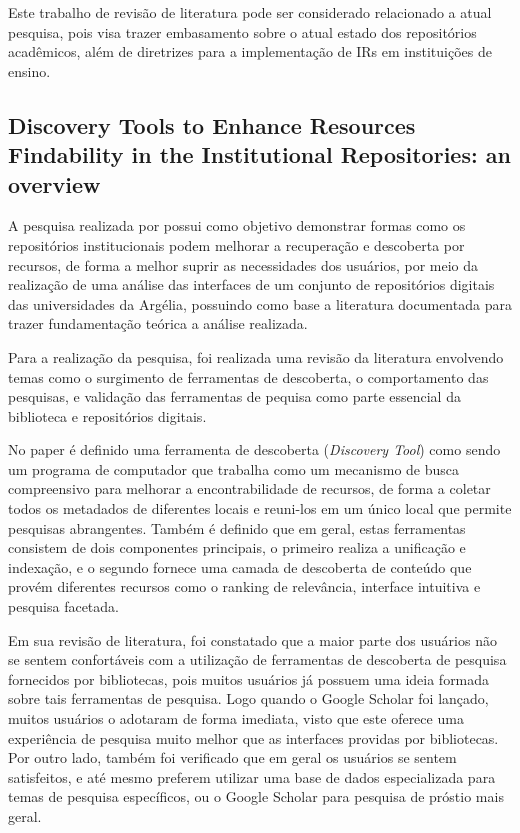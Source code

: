 Este trabalho de revisão de literatura pode ser considerado relacionado
a atual pesquisa, pois visa trazer embasamento sobre o atual estado
dos repositórios acadêmicos, além de diretrizes para a implementação
de IRs em instituições de ensino.

\subsection{Discovery Tools to Enhance Resources Findability in the Institutional Repositories: an overview}

A pesquisa realizada por \cite{2019:Mettai} possui como objetivo demonstrar
formas como os repositórios institucionais podem melhorar a recuperação e
descoberta por recursos, de forma a melhor suprir as necessidades dos usuários,
por meio da realização de uma análise das interfaces de um conjunto
de repositórios digitais das universidades da Argélia, possuindo como base
a literatura documentada para trazer fundamentação teórica a análise realizada.

Para a realização da pesquisa, foi realizada uma revisão da literatura
envolvendo temas como o surgimento de ferramentas de descoberta, o comportamento
das pesquisas, e validação das ferramentas de pequisa como parte essencial da
biblioteca e repositórios digitais.

No paper é definido uma ferramenta de descoberta (\emph{Discovery Tool}) como
sendo um programa de computador que trabalha como um mecanismo de busca
compreensivo para melhorar a encontrabilidade de recursos, de forma a coletar
todos os metadados de diferentes locais e reuni-los em um único local que
permite pesquisas abrangentes. Também é definido que em geral, estas ferramentas
consistem de dois componentes principais, o primeiro realiza a unificação
e indexação, e o segundo fornece uma camada de descoberta de conteúdo que
provém diferentes recursos como o ranking de relevância, interface intuitiva
e pesquisa facetada.

Em sua revisão de literatura, foi constatado que a maior parte dos usuários
não se sentem confortáveis com a utilização de ferramentas de descoberta de
pesquisa fornecidos por bibliotecas, pois muitos usuários já possuem uma ideia
formada sobre tais ferramentas de pesquisa. Logo quando o Google Scholar
foi lançado, muitos usuários o adotaram de forma imediata, visto que este oferece
uma experiência de pesquisa muito melhor que as interfaces providas por bibliotecas.
Por outro lado, também foi verificado que em geral os usuários se sentem
satisfeitos, e até mesmo preferem utilizar uma base de dados especializada
para temas de pesquisa específicos, ou o Google Scholar para pesquisa de
próstio mais geral.

